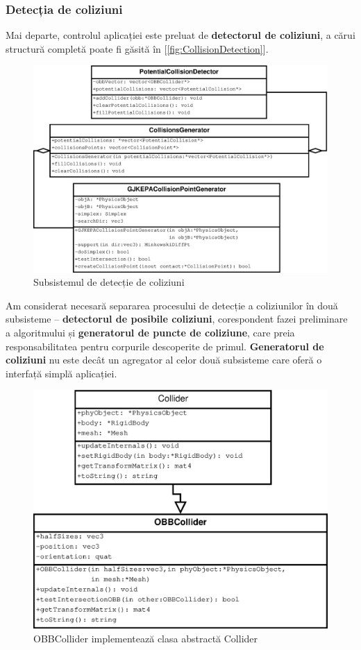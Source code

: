 \documentclass[12pt,a4paper]{report}
\begin{document}
\subsubsection{Detecția de coliziuni}
Mai departe, controlul aplicației este preluat de \textbf{detectorul de coliziuni}, a cărui structură completă poate fi găsită în [\autoref{fig:CollisionDetection}].

\begin{figure}[H]
	\centering
	\includegraphics[width=1.0\linewidth]{pics/CollisionDetectionSmall.eps}
	\caption[]{Subsistemul de detecție de coliziuni}
	\label{fig:CollisionDetectionSmall}
\end{figure}

Am considerat necesară separarea procesului de detecție a coliziunilor în două subsisteme -- \textbf{detectorul de posibile coliziuni}, corespondent fazei preliminare a algoritmului și \textbf{generatorul de puncte de coliziune}, care preia responsabilitatea pentru corpurile descoperite de primul. \textbf{Generatorul de coliziuni} nu este decât un agregator al celor două subsisteme care oferă o interfață simplă aplicației.

\begin{figure}[H]
	\centering
	\includegraphics[width=0.8\linewidth]{pics/collider.eps}
	\caption[]{OBBCollider implementează clasa abstractă Collider}
	\label{fig:collider}
\end{figure}
\end{document}

